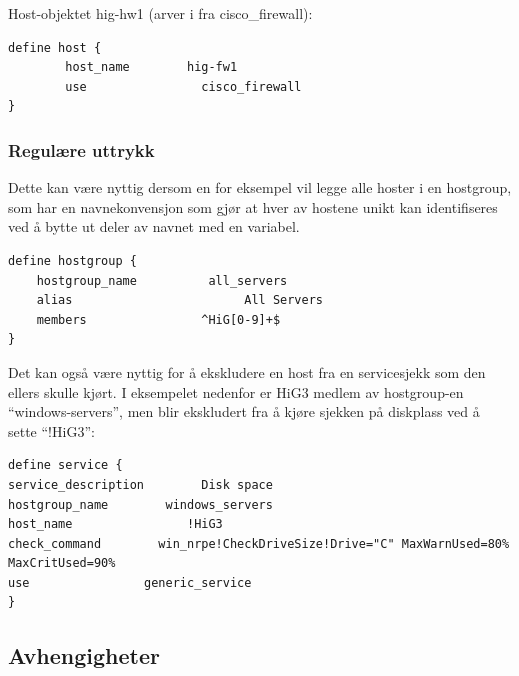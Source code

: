 Host-objektet hig-hw1 (arver i fra cisco\_firewall):

\begin{lstlisting}
define host {
        host_name        hig-fw1
        use                cisco_firewall
}
\end{lstlisting}

\subsubsection{Regulære uttrykk}

Dette kan være nyttig dersom en for eksempel vil legge alle hoster i en hostgroup, som har en navnekonvensjon som gjør at hver av hostene unikt kan identifiseres ved å bytte ut deler av navnet med en variabel.


\begin{lstlisting}
define hostgroup {
	hostgroup_name          all_servers
	alias                        All Servers
	members                ^HiG[0-9]+$
}
\end{lstlisting}

Det kan også være nyttig for å ekskludere en host fra en servicesjekk som den ellers skulle kjørt. I eksempelet nedenfor er HiG3 medlem av hostgroup-en “windows-servers”, men blir ekskludert fra å kjøre sjekken på diskplass ved å sette “!HiG3”:

\begin{lstlisting}
define service {
service_description        Disk space
hostgroup_name        windows_servers
host_name                !HiG3
check_command        win_nrpe!CheckDriveSize!Drive="C" MaxWarnUsed=80% MaxCritUsed=90%
use                generic_service
}
\end{lstlisting}

\subsection{Avhengigheter}


